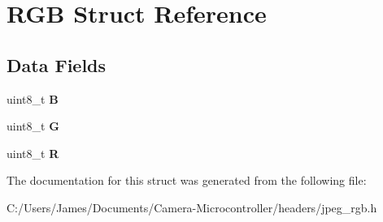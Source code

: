 \hypertarget{struct_r_g_b}{}\section{R\+GB Struct Reference}
\label{struct_r_g_b}
\subsection*{Data Fields}
\begin{DoxyCompactItemize}
\item 
\mbox{\label{struct_r_g_b_a7c7fb36d372d349a62c14f1e6c7337ea}} 
uint8\+\_\+t {\bfseries B}
\item 
\mbox{\label{struct_r_g_b_aae2a690e4df0bce516938666009b5ea6}} 
uint8\+\_\+t {\bfseries G}
\item 
\mbox{\label{struct_r_g_b_ad6dca68b61d96e60ca0062e00390ba9f}} 
uint8\+\_\+t {\bfseries R}
\end{DoxyCompactItemize}


The documentation for this struct was generated from the following file\+:\begin{DoxyCompactItemize}
\item 
C\+:/\+Users/\+James/\+Documents/\+Camera-\/\+Microcontroller/headers/jpeg\+\_\+rgb.\+h\end{DoxyCompactItemize}
